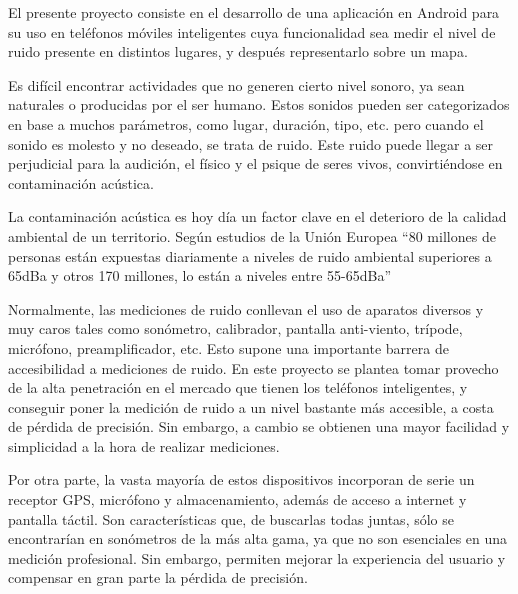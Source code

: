 

\label{sec:intro:obj}
    El presente proyecto consiste en el desarrollo de una aplicación en Android para su uso en teléfonos móviles inteligentes cuya funcionalidad sea medir el nivel de ruido presente en distintos lugares, y después representarlo sobre un mapa.

    Es difícil encontrar actividades que no generen cierto nivel sonoro, ya sean naturales o producidas por el ser humano. Estos sonidos pueden ser categorizados en base a muchos parámetros, como lugar, duración, tipo, etc. pero cuando el sonido es molesto y no deseado, se trata de ruido. Este ruido puede llegar a ser perjudicial para la audición, el físico y el psique de seres vivos, convirtiéndose en contaminación acústica.
    
    La contaminación acústica es hoy día un factor clave en el deterioro de la calidad ambiental de un territorio. Según estudios de la Unión Europea “80 millones de personas están expuestas diariamente a niveles de ruido ambiental superiores a 65dBa y otros 170 millones, lo están a niveles entre 55-65dBa” \cite{directiva}
    
    Normalmente, las mediciones de ruido conllevan el uso de aparatos diversos y muy caros tales como sonómetro, calibrador, pantalla anti-viento, trípode, micrófono, preamplificador, etc. Esto supone una importante barrera de accesibilidad a mediciones de ruido. En este proyecto se plantea tomar provecho de la alta penetración en el mercado que tienen los teléfonos inteligentes, y conseguir poner la medición de ruido a un nivel bastante más accesible, a costa de pérdida de precisión. Sin embargo, a cambio se obtienen una mayor facilidad y simplicidad a la hora de realizar mediciones.
    
    Por otra parte, la vasta mayoría de estos dispositivos incorporan de serie un receptor GPS, micrófono y almacenamiento, además de acceso a internet y pantalla táctil. Son características que, de buscarlas todas juntas, sólo se encontrarían en sonómetros de la más alta gama, ya que no son esenciales en una medición profesional. Sin embargo, permiten mejorar la experiencia del usuario y compensar en gran parte la pérdida de precisión.\

